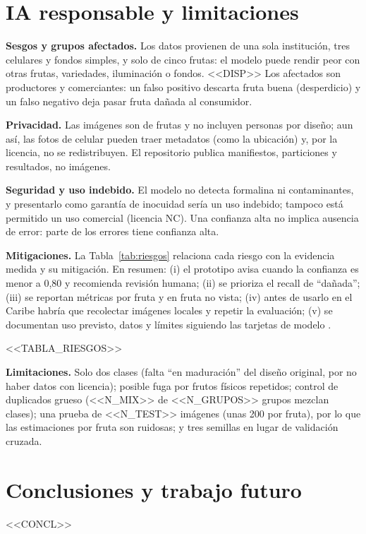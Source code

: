 \documentclass[10pt,twocolumn,letterpaper]{article}
\begin{document}
\section{IA responsable y limitaciones}
\textbf{Sesgos y grupos afectados.} Los datos provienen de una sola institución, tres celulares y fondos simples, y solo de cinco frutas: el modelo puede rendir peor con otras frutas, variedades, iluminación o fondos. <<DISP>> Los afectados son productores y comerciantes: un falso positivo descarta fruta buena (desperdicio) y un falso negativo deja pasar fruta dañada al consumidor.

\textbf{Privacidad.} Las imágenes son de frutas y no incluyen personas por diseño; aun así, las fotos de celular pueden traer metadatos (como la ubicación) y, por la licencia, no se redistribuyen. El repositorio publica manifiestos, particiones y resultados, no imágenes.

\textbf{Seguridad y uso indebido.} El modelo no detecta formalina ni contaminantes, y presentarlo como garantía de inocuidad sería un uso indebido; tampoco está permitido un uso comercial (licencia NC). Una confianza alta no implica ausencia de error: parte de los errores tiene confianza alta.

\textbf{Mitigaciones.} La Tabla~\ref{tab:riesgos} relaciona cada riesgo con la evidencia medida y su mitigación. En resumen: (i) el prototipo avisa cuando la confianza es menor a 0,80 y recomienda revisión humana; (ii) se prioriza el recall de ``dañada''; (iii) se reportan métricas por fruta y en fruta no vista; (iv) antes de usarlo en el Caribe habría que recolectar imágenes locales y repetir la evaluación; (v) se documentan uso previsto, datos y límites siguiendo las tarjetas de modelo \cite{mit}.

\begin{table}[t]\centering\footnotesize{}\caption{Riesgos de IA responsable, evidencia y mitigaciones.}\label{tab:riesgos}
<<TABLA_RIESGOS>>\end{table}

\textbf{Limitaciones.} Solo dos clases (falta ``en maduración'' del diseño original, por no haber datos con licencia); posible fuga por frutos físicos repetidos; control de duplicados grueso (<<N_MIX>> de <<N_GRUPOS>> grupos mezclan clases); una prueba de <<N_TEST>> imágenes (unas 200 por fruta), por lo que las estimaciones por fruta son ruidosas; y tres semillas en lugar de validación cruzada.

\section{Conclusiones y trabajo futuro}
<<CONCL>>
\end{document}
